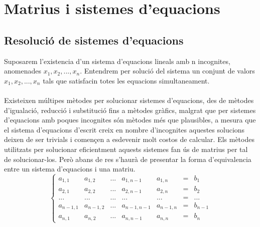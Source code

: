 \documentclass{article}
\begin{document}
\section{Matrius i sistemes d'equacions}
\subsection{Resolució de sistemes d'equacions}
    Suposarem l'existencia d'un sistema d'equacions lineals amb n incognites, anomenades $x_1, x_2, ..., x_n$. Entendrem per solució del sistema un conjunt de valors $x_1, x_2, ..., x_n$ tals que satisfacin totes les equacions simultaneament. \\ \\
    Existeixen múltipes mètodes per solucionar sistemes d'equacions, des de mètodes d'igualació, reducció i substitució fins a mètodes gràfics, malgrat que per sistemes d'equacions amb poques incognites són mètodes més que plausibles, a mesura que el sistema d'equacions d'escrit creix en nombre d'incognites aquestes solucions deixen de ser trivials i començen a esdevenir molt costos de calcular. Els mètodes utilitzats per solucionar eficientment aquests sistemes fan ús de matrius per tal de solucionar-los. Però abans de res s'haurà de presentar la forma d'equivalencia entre un sistema d'equacions i una matriu.
    \begin{equation}
        \left\{\begin{matrix}
            a_{1,1} & a_{1,2} & ... & a_{1,n-1} & a_{1,n} & = & b_1 \\ 
            a_{2,1} & a_{2,2} & ... & a_{2,n-1} & a_{2,n} & = & b_2 \\ 
            ... & ... & ... & ... & ... & = & ... \\ 
            a_{n-1,1} & a_{n-1,2} & ... & a_{n-1,n-1} & a_{n-1,n} & = & b_{n-1} \\ 
            a_{n,1} & a_{n,2} & ... & a_{n,n-1} & a_{n,n} & = & b_n
        \end{matrix}\right.
    \end{equation}
\end{document}
